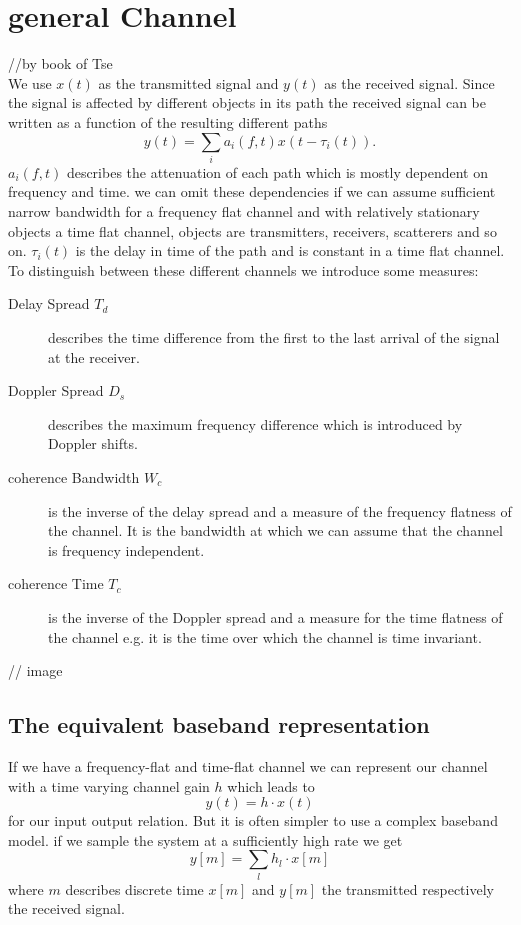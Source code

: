 \section{general Channel}
//by book of Tse\\
We use $x(t)$ as the transmitted signal and $y(t)$ as the received signal. Since the signal is affected by different objects in its path the received signal can be written as a function of the resulting different paths
\begin{equation}
y(t)=\sum_i{a_i(f,t)x(t-\tau_i(t))}.
\end{equation}
$a_i(f,t)$ describes the attenuation of each path which is mostly dependent on frequency and time. we can omit these dependencies if we can assume sufficient narrow bandwidth for a frequency flat channel and with relatively stationary objects a time flat channel, objects are transmitters, receivers, scatterers and so on. $\tau_i(t)$ is the delay in time of the path and is constant in a time flat channel.\\
To distinguish between these different channels we introduce some measures:
\begin{description}
	\item[Delay Spread $T_d$] describes the time difference from the first to the last arrival of the signal at the receiver.
	\item[Doppler Spread $D_s$] describes the maximum frequency difference which is introduced by Doppler shifts.
	\item[coherence Bandwidth $W_c$] is the inverse of the delay spread and a measure of the frequency flatness of the channel. It is the bandwidth at which we can assume that the channel is frequency independent.
	\item[coherence Time $T_c$] is the inverse of the Doppler spread and a measure for the time flatness of the channel e.g. it is the time over which the channel is time invariant. 
\end{description}
// image

\subsection{The equivalent baseband representation}
If we have a frequency-flat and time-flat channel we can represent our channel with a time varying channel gain $h$ which leads to 
\begin{equation}
	y(t) = h \cdot x(t)
\end{equation} for our input output relation. But it is often simpler to use a complex baseband model. if we sample the system at a sufficiently high rate we get 
\begin{equation}
	y[m] = \sum_l{h_l \cdot x[m]}
\end{equation}
where $m$ describes discrete time $x[m]$ and $y[m]$ the transmitted respectively the received signal.  

